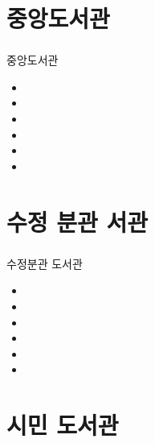 \documentclass[aspectratio=1610,17pt,xcolor=pdftex,dvipsnames,table,handout]{beamer}
\begin{document}
		\section 	{중앙도서관}

		\begin{frame} [t,plain]
		\frametitle{}

			\begin{block} {중앙도서관}
			\setlength{\leftmargini}{2em}			
			\begin{itemize}
				\item 
				\item 
				\item 
				\item 
				\item 
				\item 
			\end{itemize}
			\end{block}						
		\end{frame}						

		\section 	{수정 분관 서관}

		\begin{frame} [t,plain]
		\frametitle{}

			\begin{block} {수정분관 도서관}
			\setlength{\leftmargini}{2em}			
			\begin{itemize}
				\item 
				\item 
				\item 
				\item 
				\item 
				\item 
			\end{itemize}
			\end{block}						
		\end{frame}						

		\section 	{시민 도서관}
\end{document}
